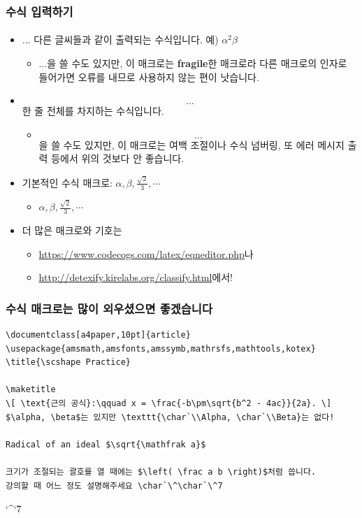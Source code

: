  \begin{frame}[fragile]
    \frametitle{수식 입력하기}
    \framesubtitle{}
    \begin{itemize}
      \item \texttt{$ ... $} 다른 글씨들과 같이 출력되는 수식입니다. 예) $\alpha^2\beta$
      \begin{itemize}
        \item \texttt{\( ... \)}을 쓸 수도 있지만, 이 매크로는 \textbf{fragile}한 매크로라 다른 매크로의 인자로 들어가면 오류를 내므로 사용하지 않는 편이 낫습니다.
      \end{itemize}
      \item \texttt{\[ ... \]} 한 줄 전체를 차지하는 수식입니다.
      \begin{itemize}
        \item \texttt{$$ ... $$}을 쓸 수도 있지만, 이 매크로는 여백 조절이나 수식 넘버링, 또 에러 메시지 출력 등에서 위의 것보다 안 좋습니다.
      \end{itemize}
      \item 기본적인 수식 매크로: \texttt{$ \alpha, \beta, \frac{\sqrt{2}}{3}, \cdots $}
      \begin{itemize}
        \item $ \alpha, \beta, \frac{\sqrt{2}}{3}, \cdots $
      \end{itemize}
      \item 더 많은 매크로와 기호는
      \begin{itemize}
        \item \url{https://www.codecogs.com/latex/eqneditor.php}나 
        \item \url{http://detexify.kirelabs.org/classify.html}에서!
      \end{itemize}
    \end{itemize}
  \end{frame}
  
  \begin{frame}[fragile]
    \frametitle{수식 매크로는 많이 외우셨으면 좋겠습니다}
    \begin{verbatim}
\documentclass[a4paper,10pt]{article}
\usepackage{amsmath,amsfonts,amssymb,mathrsfs,mathtools,kotex}
\title{\scshape Practice}

\maketitle
\[ \text{근의 공식}:\qquad x = \frac{-b\pm\sqrt{b^2 - 4ac}}{2a}. \]
$\alpha, \beta$는 있지만 \texttt{\char`\\Alpha, \char`\\Beta}는 없다!

Radical of an ideal $\sqrt{\mathfrak a}$

크기가 조절되는 괄호를 열 때에는 $\left( \frac a b \right)$처럼 씁니다.
강의할 때 어느 정도 설명해주세요 \char`\^\char`\^7

    \end{verbatim}
    \char`\^\char`\^7
  \end{frame}


